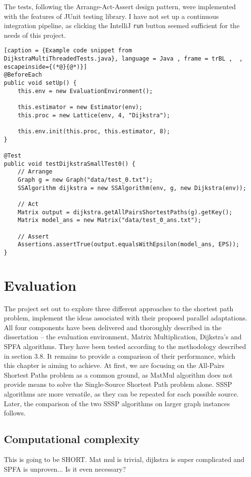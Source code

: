 \documentclass[12pt,a4paper,twoside,openright]{report}
\begin{document}
The tests, following the Arrange-Act-Assert design pattern, were implemented with the features of JUnit testing library. I have not set up a continuous integration pipeline, as clicking the IntelliJ \texttt{run} button seemed sufficient for the needs of this project.

\begin{lstlisting}[caption = {Example code snippet from DijkstraMultiThreadedTests.java}, language = Java , frame = trBL ,  , escapeinside={(*@}{@*)}]
@BeforeEach
public void setUp() {
    this.env = new EvaluationEnvironment();
    
    this.estimator = new Estimator(env);
    this.proc = new Lattice(env, 4, "Dijkstra");
    
    this.env.init(this.proc, this.estimator, 8);
}
    
@Test
public void testDijkstraSmallTest0() {
    // Arrange
    Graph g = new Graph("data/test_0.txt");
    SSAlgorithm dijkstra = new SSAlgorithm(env, g, new Dijkstra(env));

    // Act
    Matrix output = dijkstra.getAllPairsShortestPaths(g).getKey();
    Matrix model_ans = new Matrix("data/test_0_ans.txt");

    // Assert
    Assertions.assertTrue(output.equalsWithEpsilon(model_ans, EPS));
}

\end{lstlisting}
\chapter{Evaluation}
The project set out to explore three different approaches to the shortest path problem, implement the ideas associated with their proposed parallel adaptations. All four components have been delivered and thoroughly described in the dissertation -- the evaluation environment, Matrix Multiplication, Dijkstra's and SPFA algorithms. They have been tested according to the methodology described in section 3.8. It remains to provide a comparison of their performance, which this chapter is aiming to achieve. At first, we are focusing on the All-Pairs Shortest Paths problem as a common ground, as MatMul algorithm does not provide means to solve the Single-Source Shortest Path problem alone. SSSP algorithms are more versatile, as they can be repeated for each possible source. Later, the comparison of the two SSSP algorithms on larger graph instances follows.

\section{Computational complexity}
This is going to be SHORT. Mat mul is trivial, dijkstra is super complicated and SPFA is unproven... Is it even necessary?
\end{document}
